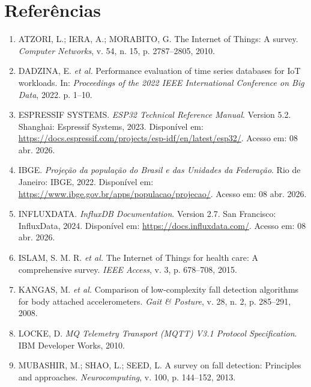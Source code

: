 \documentclass[a4paper,12pt]{article}
\begin{document}
\newpage
\section*{Referências}

\begin{enumerate}[leftmargin=0cm, labelindent=0cm, label={}]
    \item ATZORI, L.; IERA, A.; MORABITO, G. The Internet of Things: A survey. \textit{Computer Networks}, v. 54, n. 15, p. 2787--2805, 2010.

    \item DADZINA, E. \textit{et al.} Performance evaluation of time series databases for IoT workloads. In: \textit{Proceedings of the 2022 IEEE International Conference on Big Data}, 2022. p. 1--10.

    \item ESPRESSIF SYSTEMS. \textit{ESP32 Technical Reference Manual}. Version 5.2. Shanghai: Espressif Systems, 2023. Disponível em: \url{https://docs.espressif.com/projects/esp-idf/en/latest/esp32/}. Acesso em: 08 abr. 2026.

    \item IBGE. \textit{Projeção da população do Brasil e das Unidades da Federação}. Rio de Janeiro: IBGE, 2022. Disponível em: \url{https://www.ibge.gov.br/apps/populacao/projecao/}. Acesso em: 08 abr. 2026.

    \item INFLUXDATA. \textit{InfluxDB Documentation}. Version 2.7. San Francisco: InfluxData, 2024. Disponível em: \url{https://docs.influxdata.com/}. Acesso em: 08 abr. 2026.

    \item ISLAM, S. M. R. \textit{et al.} The Internet of Things for health care: A comprehensive survey. \textit{IEEE Access}, v. 3, p. 678--708, 2015.

    \item KANGAS, M. \textit{et al.} Comparison of low-complexity fall detection algorithms for body attached accelerometers. \textit{Gait \& Posture}, v. 28, n. 2, p. 285--291, 2008.

    \item LOCKE, D. \textit{MQ Telemetry Transport (MQTT) V3.1 Protocol Specification}. IBM Developer Works, 2010.

    \item MUBASHIR, M.; SHAO, L.; SEED, L. A survey on fall detection: Principles and approaches. \textit{Neurocomputing}, v. 100, p. 144--152, 2013.


\end{enumerate}
\end{document}
